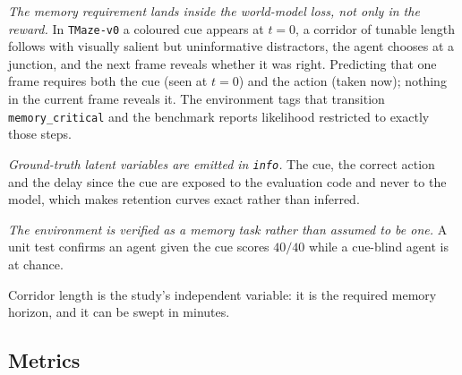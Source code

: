 \documentclass[11pt,a4paper]{article}
\newcommand{\code}[1]{\texttt{\small #1}}
\begin{document}
\emph{The memory requirement lands inside the world-model loss, not only in the
reward.} In \code{TMaze-v0} a coloured cue appears at $t=0$, a corridor of
tunable length follows with visually salient but uninformative distractors, the
agent chooses at a junction, and the next frame reveals whether it was right.
Predicting that one frame requires both the cue (seen at $t=0$) and the action
(taken now); nothing in the current frame reveals it. The environment tags that
transition \code{memory\_critical} and the benchmark reports likelihood
restricted to exactly those steps.

\emph{Ground-truth latent variables are emitted in \code{info}.} The cue, the
correct action and the delay since the cue are exposed to the evaluation code and
never to the model, which makes retention curves exact rather than inferred.

\emph{The environment is verified as a memory task rather than assumed to be
one.} A unit test confirms an agent given the cue scores $40/40$ while a
cue-blind agent is at chance.

Corridor length is the study's independent variable: it is the required memory
horizon, and it can be swept in minutes.

\subsection{Metrics}
\end{document}
